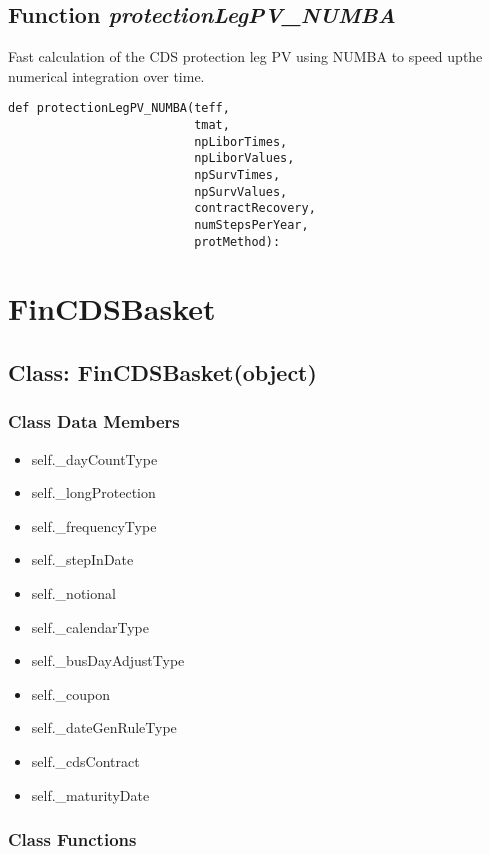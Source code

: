 \documentclass[twoside,11pt]{book}
\begin{document}
\subsection{Function {\it protectionLegPV\_NUMBA}}
Fast calculation of the CDS protection leg PV using NUMBA to speed upthe numerical integration over time. 

\begin{lstlisting}
def protectionLegPV_NUMBA(teff,
                          tmat,
                          npLiborTimes,
                          npLiborValues,
                          npSurvTimes,
                          npSurvValues,
                          contractRecovery,
                          numStepsPerYear,
                          protMethod):
\end{lstlisting}

\newpage
\section{FinCDSBasket}

\subsection{Class: FinCDSBasket(object)}


\subsubsection{Class Data Members}
\begin{itemize}
\item{self.\_dayCountType}
\item{self.\_longProtection}
\item{self.\_frequencyType}
\item{self.\_stepInDate}
\item{self.\_notional}
\item{self.\_calendarType}
\item{self.\_busDayAdjustType}
\item{self.\_coupon}
\item{self.\_dateGenRuleType}
\item{self.\_cdsContract}
\item{self.\_maturityDate}
\end{itemize}

\subsubsection{Class Functions}
\end{document}
